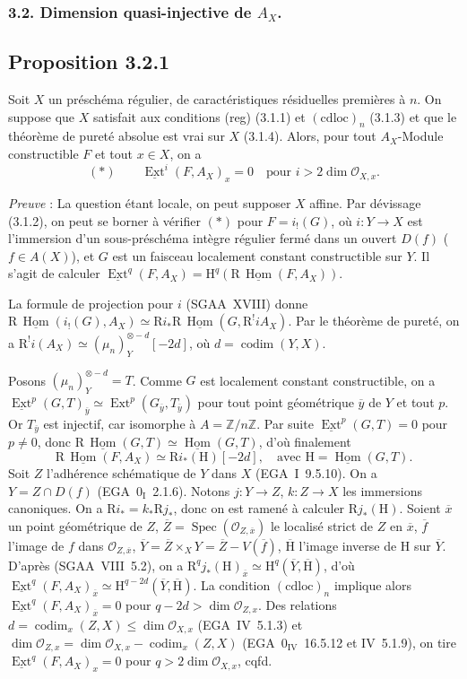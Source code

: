 \documentclass[11pt]{article}
\DeclareMathOperator{\codim}{codim}
\providecommand{\cO}{\mathcal{O}}
\renewcommand{\H}{\mathrm{H}}
\DeclareMathOperator{\Hom}{Hom}
\DeclareMathOperator{\Ext}{Ext}
\DeclareMathOperator{\Spec}{Spec}
\newcommand{\R}{\mathrm{R}}\newcommand{\RHomCore}{\mathrm{RHom}}
\newcommand{\Z}{\mathbb{Z}}
\newcommand{\ol}[1]{\overline{#1}}
\providecommand{\Hom}{\operatorname{Hom}}
\providecommand{\R}{\mathrm R}
\providecommand{\Z}{\mathbb Z}
\providecommand{\Spec}{\operatorname{Spec}}
\providecommand{\Spec}{\operatorname{Spec}}
\providecommand{\Hom}{\operatorname{Hom}}
\providecommand{\Spec}{\operatorname{Spec}}
\providecommand{\Spec}{\operatorname{Spec}}
\begin{document}
\subsubsection*{3.2. Dimension quasi-injective de \texorpdfstring{$A_X$}{A\_X}.}

\subsection*{Proposition 3.2.1}
Soit $X$ un préschéma régulier, de caractéristiques résiduelles premières à $n$. On suppose que $X$ satisfait aux conditions (reg) (3.1.1) et $(\mathrm{cdloc})_n$ (3.1.3) et que le théorème de pureté absolue est vrai sur $X$ (3.1.4). Alors, pour tout $A_X$-Module constructible $F$ et tout $x \in X$, on a
\[
(*) \qquad \underline{\Ext}^i(F, A_X)_x = 0 \quad \text{pour } i > 2\dim \cO_{X,x}.
\]

\emph{Preuve} : La question étant locale, on peut supposer $X$ affine. Par dévissage (3.1.2), on peut se borner à vérifier $(*)$ pour $F = i_{!}(G)$, où $i : Y \to X$ est l'immersion d'un sous-préschéma intègre régulier fermé dans un ouvert $D(f)$ ($f \in A(X)$), et $G$ est un faisceau localement constant
constructible sur $Y$. Il s'agit de calculer $\underline{\Ext}^q(F, A_X) = \H^q(\R\,\underline{\Hom}(F, A_X))$.

La formule de projection pour $i$ (SGAA~XVIII) donne $\R\,\underline{\Hom}(i_{!}(G), A_X) \simeq \R i_{*} \R\,\underline{\Hom}(G, \R^{!}iA_X)$. Par le théorème de pureté, on a $\R^{!}i(A_X) \simeq (\mu_n)^{\otimes -d}_Y[-2d]$, où $d = \codim(Y,X)$.

Posons $(\mu_n)^{\otimes -d}_Y = T$. Comme $G$ est localement constant constructible, on a $\underline{\Ext}^p(G,T)_{\ol{y}} \simeq \Ext^p(G_{\ol{y}}, T_{\ol{y}})$ pour tout point géométrique $\ol{y}$ de $Y$ et tout $p$. Or $T_{\ol{y}}$ est injectif, car isomorphe à $A = \Z/n\Z$. Par suite $\underline{\Ext}^p(G,T) = 0$ pour $p \neq 0$, donc $\R\,\underline{\Hom}(G,T) \simeq \underline{\Hom}(G,T)$, d'où finalement
\[
\R\,\underline{\Hom}(F, A_X) \simeq \R i_{*}(\H)[-2d], \quad \text{avec } \H = \underline{\Hom}(G,T).
\]
Soit $Z$ l'adhérence schématique de $Y$ dans $X$ (EGA~I~9.5.10). On a $Y = Z \cap D(f)$ (EGA~$0_{\mathrm{I}}$~2.1.6). Notons $j : Y \to Z$, $k : Z \to X$ les immersions canoniques. On a $\R i_{*} = k_{*} \R j_{*}$, donc on est ramené à calculer $\R j_{*}(\H)$. Soient $\ol{x}$ un point géométrique de $Z$, $\ol{Z} = \Spec(\cO_{Z,\ol{x}})$ le localisé strict de $Z$ en $\ol{x}$, $\ol{f}$ l'image de $f$ dans $\cO_{Z,\ol{x}}$, $\ol{Y} = \ol{Z} \times_X Y = \ol{Z} - V(\ol{f})$, $\ol{\H}$ l'image inverse de $\H$ sur $\ol{Y}$. D'après (SGAA~VIII~5.2), on a $\mathrm{R}^q j_{*}(\H)_{\ol{x}} \simeq \H^q(\ol{Y}, \ol{\H})$, d'où $\underline{\Ext}^q(F, A_X)_{\ol{x}} \simeq \H^{q-2d}(\ol{Y}, \ol{\H})$. La condition $(\mathrm{cdloc})_n$ implique alors $\underline{\Ext}^q(F, A_X)_{\ol{x}} = 0$ pour $q - 2d > \dim \cO_{Z,x}$. Des relations $d = \codim_{x}(Z,X) \leqslant \dim \cO_{X,x}$ (EGA~IV~5.1.3) et $\dim \cO_{Z,x} = \dim \cO_{X,x} - \codim_{x}(Z,X)$ (EGA~$0_{\mathrm{IV}}$~16.5.12 et IV~5.1.9), on tire $\underline{\Ext}^q(F, A_X)_x = 0$ pour $q > 2\dim \cO_{X,x}$, cqfd.
\end{document}
